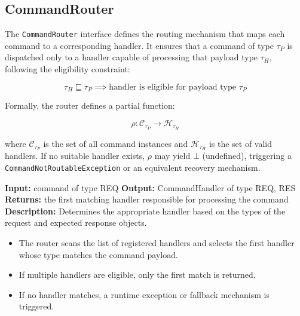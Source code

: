 \subsection{CommandRouter}

The \texttt{CommandRouter} interface defines the routing mechanism that maps each command to a corresponding handler.  
It ensures that a command of type $\tau_P$ is dispatched only to a handler capable of processing that payload type $\tau_H$, following the eligibility constraint:

\[
\tau_H \sqsubseteq \tau_P \implies \text{handler is eligible for payload type } \tau_P
\]

Formally, the router defines a partial function:

\[
\rho : \mathcal{C}_{\tau_P} \rightarrow \mathcal{H}_{\tau_H}
\]

where $\mathcal{C}_{\tau_P}$ is the set of all command instances and $\mathcal{H}_{\tau_H}$ is the set of valid handlers.  
If no suitable handler exists, $\rho$ may yield $\bot$ (undefined), triggering a \texttt{CommandNotRoutableException} or an equivalent recovery mechanism.

\begin{algorithm}[H]
\caption{CommandRouter (\emph{Interface})}
\begin{algorithmic}[1]
    \State \textbf{Input:} command of type \textlangle REQ\textrangle
    \State \textbf{Output:} CommandHandler of type \textlangle REQ, RES\textrangle
    \State \textbf{Returns:} the first matching handler responsible for processing the command
    \State \textbf{Description:} 
        Determines the appropriate handler based on the types of the request and expected response objects.
        \begin{itemize}
            \item The router scans the list of registered handlers and selects the first handler whose type matches the command payload.
            \item If multiple handlers are eligible, only the first match is returned.
            \item If no handler matches, a runtime exception or fallback mechanism is triggered.
        \end{itemize}
\EndProcedure
\end{algorithmic}
\end{algorithm}